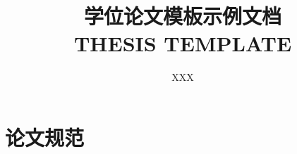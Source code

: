 \documentclass[bachelor]{swjtuthesis}
\title{学位论文模板示例文档\\ \uppercase{Thesis template}}
\author{XXX}
\begin{document}
\maketitle

%

\frontmatter


\tableofcontents
\listoffigures
\listoftables
% 

\mainmatter






\appendix
\chapter{论文规范}

\backmatter


\end{document}
